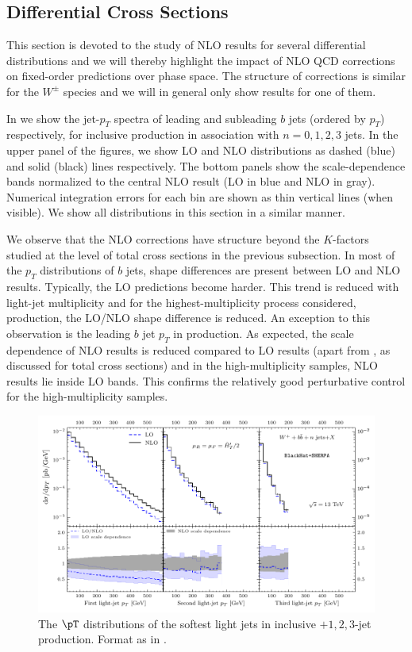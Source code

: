 \subsection{Differential Cross Sections}
\label{diffxsw}

This section is devoted to the study of NLO results for several differential
distributions and we will thereby highlight the impact of NLO QCD corrections on fixed-order predictions over phase space. The structure of corrections is similar for the $W^\pm$ species and we will in general only show results for one of them.

In  we show the jet-$p_T$ spectra of leading
and subleading $b$ jets (ordered by $p_T$) respectively, for inclusive
\Wbbm{} production in association with $n=0,1,2,3$ jets. In the upper panel of the
figures, we show LO and NLO distributions as dashed (blue) and solid (black)
lines respectively. The bottom panels show the scale-dependence bands
normalized to the central NLO result (LO in blue and NLO in gray). Numerical
integration errors for each bin are shown as thin vertical lines (when visible).
We show all distributions in this section in a similar manner.

We observe that the NLO corrections have structure beyond the $K$-factors studied at
the level of total cross sections in the previous subsection. In most of the $p_T$ distributions of $b$ jets, shape differences
are present between LO and NLO results. Typically, the LO predictions become harder. This trend is reduced with light-jet multiplicity and for the highest-multiplicity process considered, \Wbbnj[3]{} production,
the LO/NLO shape difference
is reduced. An exception to this observation is the leading
$b$ jet $p_T$ in \Wbb{} production. As expected, the scale dependence of NLO
results is reduced compared to LO results (apart from \Wbb{}, as
discussed for total cross sections) and in the high-multiplicity samples, NLO results
lie inside LO bands. This confirms the relatively good perturbative control for the high-multiplicity samples.

\begin{figure}[t]
\centering
\includegraphics[clip,scale=1]{plots/softestpt}
  \caption{The $\pT$
distributions of the softest light jets in inclusive \Wbbp$+1,2,3$-jet production.
Format as in .}
  \label{fig_Wmnjptlight}
\end{figure}

